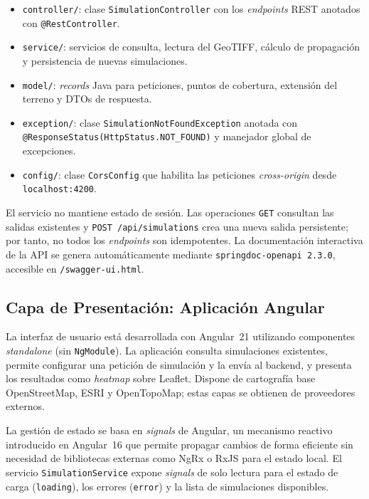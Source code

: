\begin{itemize}
  \item \lstinline{controller/}: clase \lstinline{SimulationController} con los
    \textit{endpoints} REST anotados con \lstinline{@RestController}.
  \item \lstinline{service/}: servicios de consulta, lectura del GeoTIFF, cálculo de
    propagación y persistencia de nuevas simulaciones.
  \item \lstinline{model/}: \textit{records} Java para peticiones, puntos de cobertura,
    extensión del terreno y DTOs de respuesta.
  \item \lstinline{exception/}: clase \lstinline{SimulationNotFoundException} anotada con
    \lstinline{@ResponseStatus(HttpStatus.NOT_FOUND)} y manejador global de excepciones.
  \item \lstinline{config/}: clase \lstinline{CorsConfig} que habilita las peticiones
    \textit{cross-origin} desde \lstinline{localhost:4200}.
\end{itemize}

El servicio no mantiene estado de sesión. Las operaciones \lstinline{GET} consultan las
salidas existentes y \lstinline{POST /api/simulations} crea una nueva salida persistente;
por tanto, no todos los \textit{endpoints} son idempotentes. La documentación interactiva
de la API se genera automáticamente mediante
\lstinline{springdoc-openapi 2.3.0}, accesible en \lstinline{/swagger-ui.html}.

\subsection{Capa de Presentación: Aplicación Angular}
\label{subsec:arq_frontend}

La interfaz de usuario está desarrollada con Angular~21 utilizando componentes
\textit{standalone} (sin \lstinline{NgModule}). La aplicación consulta simulaciones
existentes, permite configurar una petición de simulación y la envía al backend, y presenta
los resultados como \textit{heatmap} sobre Leaflet. Dispone de cartografía base OpenStreetMap,
ESRI y OpenTopoMap; estas capas se obtienen de proveedores externos.

La gestión de estado se basa en \textit{signals} de Angular, un mecanismo reactivo
introducido en Angular~16 que permite propagar cambios de forma eficiente sin necesidad de
bibliotecas externas como NgRx o RxJS para el estado local. El servicio
\lstinline{SimulationService} expone \textit{signals} de solo lectura para el estado de
carga (\lstinline{loading}), los errores (\lstinline{error}) y la lista de simulaciones
disponibles.


